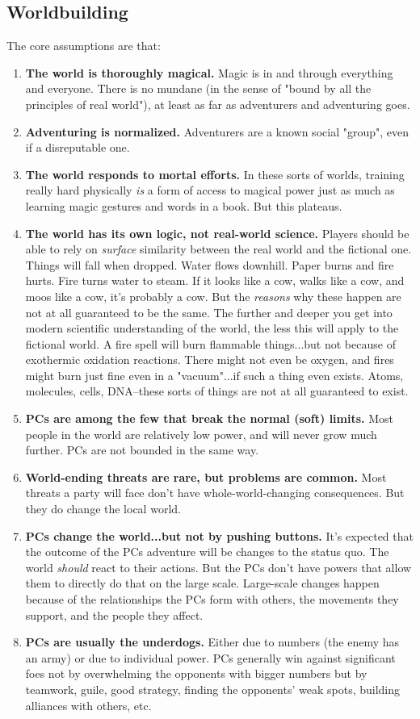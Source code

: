 \subsection{Worldbuilding}
The core assumptions are that:
\begin{enumerate}
\item \textbf{The world is thoroughly magical.} Magic is in and through everything and everyone. There is no mundane (in the sense of "bound by all the principles of real world"), at least as far as adventurers and adventuring goes.
\item \textbf{Adventuring is normalized.} Adventurers are a known social "group", even if a disreputable one.
\item \textbf{The world responds to mortal efforts.} In these sorts of worlds, training really hard physically \textit{is} a form of access to magical power just as much as learning magic gestures and words in a book. But this plateaus.
\item \textbf{The world has its own logic, not real-world science.} Players should be able to rely on \textit{surface} similarity between the real world and the fictional one. Things will fall when dropped. Water flows downhill. Paper burns and fire hurts. Fire turns water to steam. If it looks like a cow, walks like a cow, and moos like a cow, it's probably a cow. But the \textit{reasons} why these happen are not at all guaranteed to be the same. The further and deeper you get into modern scientific understanding of the world, the less this will apply to the fictional world. A fire spell will burn flammable things...but not because of exothermic oxidation reactions. There might not even be oxygen, and fires might burn just fine even in a "vacuum"...if such a thing even exists. Atoms, molecules, cells, DNA--these sorts of things are not at all guaranteed to exist.
\item \textbf{PCs are among the few that break the normal (soft) limits.} Most people in the world are relatively low power, and will never grow much further. PCs are not bounded in the same way.
\item \textbf{World-ending threats are rare, but problems are common.} Most threats a party will face don't have whole-world-changing consequences. But they do change the local world.
\item \textbf{PCs change the world...but not by pushing buttons.} It's expected that the outcome of the PCs adventure will be changes to the status quo. The world \textit{should} react to their actions. But the PCs don't have powers that allow them to directly do that on the large scale. Large-scale changes happen because of the relationships the PCs form with others, the movements they support, and the people they affect.
\item \textbf{PCs are usually the underdogs.} Either due to numbers (the enemy has an army) or due to individual power. PCs generally win against significant foes not by overwhelming the opponents with bigger numbers but by teamwork, guile, good strategy, finding the opponents' weak spots, building alliances with others, etc. 
\end{enumerate}